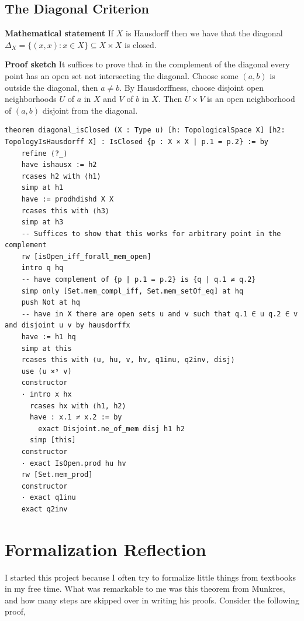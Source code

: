 \documentclass[11pt]{article}
\begin{document}
\subsection{The Diagonal Criterion}

\textbf{Mathematical statement} 
If $X$ is Hausdorff then we have that the diagonal $\Delta_X = \{(x,x) : x\in X\}\subseteq X\times X$ is closed.

\textbf{Proof sketch} 
It suffices to prove that in the complement of the diagonal every point has an open set not intersecting the diagonal. Choose some $(a,b)$ is outside the diagonal, then $a\neq b$. By Hausdorffness, choose disjoint open neighborhoods $U$ of $a$ in $X$ and $V$ of $b$ in $X$. Then $U\times V$ is an open neighborhood of $(a,b)$ disjoint from the diagonal.

\begin{verbatim}
theorem diagonal_isClosed (X : Type u) [h: TopologicalSpace X] [h2: TopologyIsHausdorff X] : IsClosed {p : X × X | p.1 = p.2} := by 
    refine ⟨?_⟩
    have ishausx := h2
    rcases h2 with ⟨h1⟩
    simp at h1
    have := prodhdishd X X 
    rcases this with ⟨h3⟩
    simp at h3
    -- Suffices to show that this works for arbitrary point in the complement
    rw [isOpen_iff_forall_mem_open]
    intro q hq 
    -- have complement of {p | p.1 = p.2} is {q | q.1 ≠ q.2}
    simp only [Set.mem_compl_iff, Set.mem_setOf_eq] at hq 
    push Not at hq 
    -- have in X there are open sets u and v such that q.1 ∈ u q.2 ∈ v and disjoint u v by hausdorffx
    have := h1 hq 
    simp at this
    rcases this with ⟨u, hu, v, hv, q1inu, q2inv, disj⟩
    use (u ×ˢ v) 
    constructor
    · intro x hx
      rcases hx with ⟨h1, h2⟩ 
      have : x.1 ≠ x.2 := by 
        exact Disjoint.ne_of_mem disj h1 h2
      simp [this]
    constructor
    · exact IsOpen.prod hu hv     
    rw [Set.mem_prod]
    constructor
    · exact q1inu
    exact q2inv
\end{verbatim}

\section{Formalization Reflection}

I started this project because I often try to formalize little things from textbooks in my free time. What was remarkable to me was this theorem from Munkres, and how many steps are skipped over in writing his proofs. Consider the following proof, 
\end{document}
